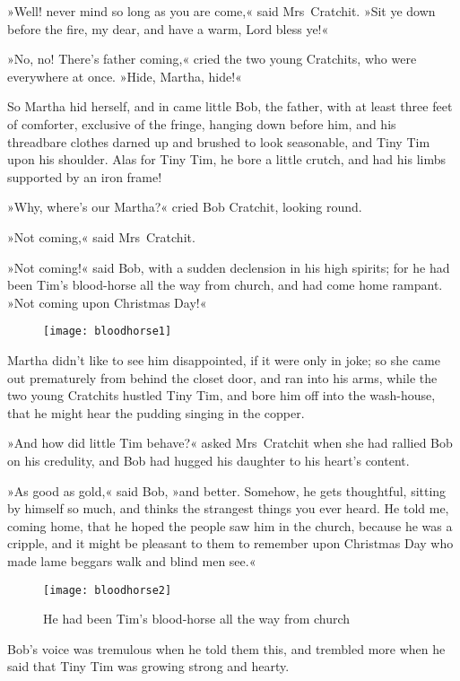 »Well! never mind so long as you are come,« said Mrs~Cratchit. »Sit ye down before the fire, my dear, and have a warm, Lord bless ye!«

»No, no! There's father coming,« cried the two young Cratchits, who were everywhere at once. »Hide, Martha, hide!«


So Martha hid herself, and in came little Bob, the father, with at least three feet of comforter, exclusive of the fringe, hanging down before him, and his threadbare clothes darned up and brushed to look seasonable, and Tiny Tim upon his shoulder. Alas for Tiny Tim, he bore a little crutch, and had his limbs supported by an iron frame!

»Why, where's our Martha?« cried Bob Cratchit, looking round.

»Not coming,« said Mrs~Cratchit.


»Not coming!« said Bob, with a sudden declension in his high spirits; for he had been Tim's blood-horse all the way from church, and had come home rampant. »Not coming upon Christmas Day!«


\begin{figure}[t!]
\centering
\texttt{[image: bloodhorse1]}
\end{figure}

Martha didn't like to see him disappointed, if it were only in joke; so she came out prematurely from behind the closet door, and ran into his arms, while the two young Cratchits hustled Tiny Tim, and bore him off into the wash-house, that he might hear the pudding singing in the copper.

»And how did little Tim behave?« asked Mrs~Cratchit when she had rallied Bob on his credulity, and Bob had hugged his daughter to his heart's content.


»As good as gold,« said Bob, »and better. Somehow, he gets  thoughtful, sitting by himself so much, and thinks the strangest things you ever heard. He told me, coming home, that he hoped the people saw him in the church, because he was a cripple, and it might be pleasant to them to remember upon Christmas Day who made lame beggars walk and blind men see.«

\begin{figure}[th!]
\centering
\texttt{[image: bloodhorse2]}
\caption{He had been Tim's blood-horse all the way from church}
\end{figure}

Bob's voice was tremulous when he told them this, and trem\-bled more when he said that Tiny Tim was growing strong and hearty.

